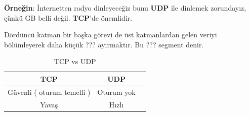 \textbf{Örneğin}: İnternetten radyo dinleyeceğiz bunu \textbf{UDP} ile dinlemek zorundayız, çünkü GB belli değil.
\textbf{TCP}'de önemlidir.

\tab Dördüncü katman bir başka görevi de üst katmanlardan gelen veriyi bölümleyerek daha küçük ??? ayırmaktır.
Bu ??? segment denir.

\begin{table}[h]
	\centering
	\caption{TCP vs UDP}
	\label{tab:tcp_vs_upd}
	\begin{tabular}{|c|c|c|}
		\hline
		TCP  & UDP \\
		\hline
		Güvenli ( oturum temelli ) & Oturum yok \\
		\hline
		 Yavaş & Hızlı \\
		\hline
	\end{tabular}
\end{table}


